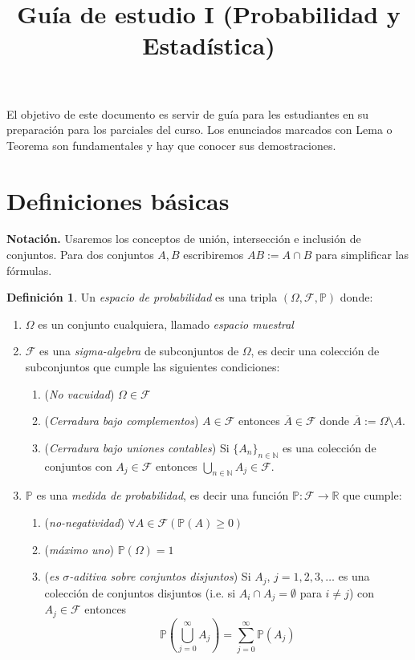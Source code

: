 \documentclass[12pt]{amsart}
\title{Guía de estudio I (Probabilidad y Estadística)}
\theoremstyle{definition}
\newtheorem{definition}[lemma]{Definición}
\renewcommand{\geq}{\geqslant}
\newcommand{\PP}{\ensuremath{\mathbb{P}}}
\newcommand{\RR}{\ensuremath{\mathbb{R}}}
\newcommand{\calF}{\ensuremath{\mathcal{F}}}
\begin{document}
\maketitle
El objetivo de este documento es servir de guía para les estudiantes en su preparación para los parciales del curso.
Los enunciados marcados con Lema o Teorema son fundamentales y hay que conocer sus demostraciones. 


\section{Definiciones básicas}

{\bf Notación.} Usaremos los conceptos de unión, intersección e inclusión de conjuntos. Para dos conjuntos $A,B$ escribiremos $AB:=A\cap B$ para simplificar las fórmulas.



\begin{definition} Un \emph{espacio de probabilidad} es una tripla $(\Omega,\calF,\PP)$ donde:

\begin{enumerate}
\item $\Omega$ es un conjunto cualquiera, llamado \emph{espacio muestral}
\item $\calF$ es una \emph{sigma-algebra} de subconjuntos de $\Omega$, es decir una colección de subconjuntos que cumple las siguientes condiciones:
\begin{enumerate}
\item (\emph{No vacuidad}) $\Omega\in \calF$
\item (\emph{Cerradura bajo complementos}) $A\in \calF$ entonces $\overline{A}\in \calF$ donde $\overline{A}:=\Omega\setminus A$.
\item (\emph{Cerradura bajo uniones contables}) Si $\{A_n\}_{n\in \mathbb{N}}$ es una colección de conjuntos con $A_j\in \calF$ entonces $\bigcup_{n\in \mathbb{N}} A_j\in \calF$.
\end{enumerate}
\item $\PP$ es una \emph{medida de probabilidad}, es decir una funci\'on $\PP: \calF\rightarrow \RR$ que cumple:
\begin{enumerate}
\item (\emph{no-negatividad}) $\forall A\in \calF\left(\PP(A)\geq 0\right)$
\item (\emph{máximo uno}) $\PP(\Omega)=1$
\item (\emph{es $\sigma$-aditiva sobre conjuntos disjuntos}) Si $A_j$, $j=1,2,3,\dots$ es una colección de conjuntos disjuntos (i.e. si $A_i\cap A_j=\emptyset$ para $i\neq j$) con $A_j\in \calF$ entonces 
\[\PP\left(\bigcup_{j=0}^\infty A_j\right)=\sum_{j=0}^{\infty} \PP(A_j)\]
\end{enumerate} 
\end{enumerate}
\end{definition}
\end{document}
